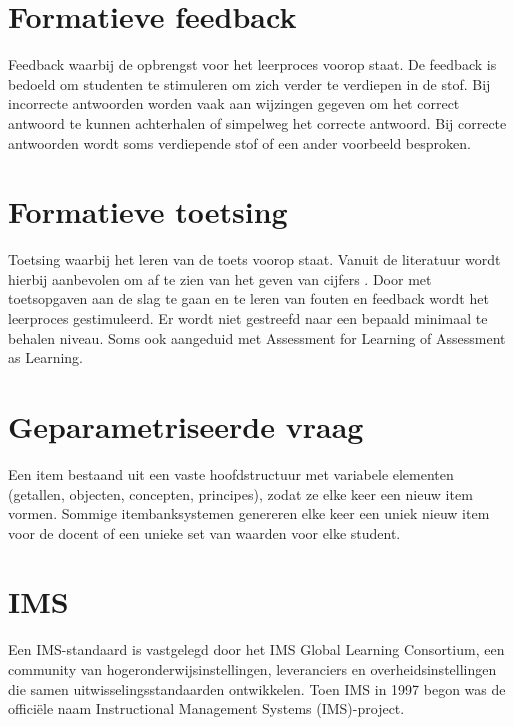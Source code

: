 \documentclass[
  letterpaper,
  DIV=11,
  numbers=noendperiod]{scrreprt}
\begin{document}
\hypertarget{formatieve-feedback}{%
\section{Formatieve feedback}\label{formatieve-feedback}}

Feedback waarbij de opbrengst voor het leerproces voorop staat. De
feedback is bedoeld om studenten te stimuleren om zich verder te
verdiepen in de stof. Bij incorrecte antwoorden worden vaak aan
wijzingen gegeven om het correct antwoord te kunnen achterhalen of
simpelweg het correcte antwoord. Bij correcte antwoorden wordt soms
verdiepende stof of een ander voorbeeld besproken.

\hypertarget{formatieve-toetsing}{%
\section{Formatieve toetsing}\label{formatieve-toetsing}}

Toetsing waarbij het leren van de toets voorop staat. Vanuit de
literatuur wordt hierbij aanbevolen om af te zien van het geven van
cijfers . Door met toetsopgaven aan de slag te gaan en te leren van
fouten en feedback wordt het leerproces gestimuleerd. Er wordt niet
gestreefd naar een bepaald minimaal te behalen niveau. Soms ook
aangeduid met Assessment for Learning of Assessment as Learning.

\hypertarget{geparametriseerde-vraag}{%
\section{Geparametriseerde vraag}\label{geparametriseerde-vraag}}

Een item bestaand uit een vaste hoofdstructuur met variabele elementen
(getallen, objecten, concepten, principes), zodat ze elke keer een nieuw
item vormen. Sommige itembanksystemen genereren elke keer een uniek
nieuw item voor de docent of een unieke set van waarden voor elke
student.

\hypertarget{ims}{%
\section{IMS}\label{ims}}

Een IMS-standaard is vastgelegd door het IMS Global Learning Consortium,
een community van hogeronderwijsinstellingen, leveranciers en
overheidsinstellingen die samen uitwisselingsstandaarden ontwikkelen.
Toen IMS in 1997 begon was de officiële naam Instructional Management
Systems (IMS)-project.
\end{document}
